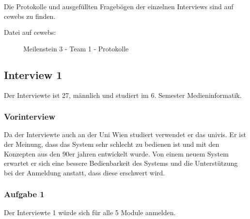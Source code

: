 \documentclass[a4paper,10pt]{scrartcl}
\begin{document}
Die Protokolle und ausgefüllten Fragebögen der einzelnen Interviews sind auf cewebs zu finden.

\begin{description}
 \item[Datei auf cewebs:]Meilenstein 3 - Team 1 - Protokolle
\end{description}

\subsection*{Interview 1}

Der Interviewte ist 27, männlich und studiert im 6. Semester Medieninformatik.

\subsubsection*{Vorinterview}

Da der Interviewte auch an der Uni Wien studiert verwendet er das univis. Er ist der Meinung, dass das System sehr schlecht zu bedienen ist und mit den Konzepten
aus den 90er jahren entwickelt wurde. Von einem neuem System erwartet er sich eine bessere Bedienbarkeit des Systems und die Unterstützung bei der Anmeldung
anstatt, dass diese erschwert wird.

\subsubsection*{Aufgabe 1}

Der Interviewte 1 würde sich für alle 5 Module anmelden.
\end{document}
